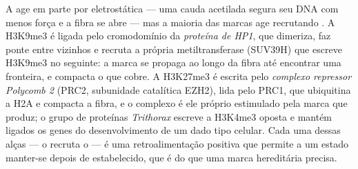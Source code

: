 \begin{proposition}\label{prop:b3:chromatin-epigenetics:readers}
A  age em parte por eletrostática --- uma cauda acetilada
segura seu DNA com menos força e a fibra se abre --- mas a maioria das
marcas age recrutando . A H3K9me3 é ligada pelo cromodomínio
da \emph{proteína de  HP1}, que dimeriza, faz ponte
entre  vizinhos e recruta a própria metiltransferase
(SUV39H) que escreve H3K9me3 no  seguinte: a marca se
propaga ao longo da fibra até encontrar uma fronteira, e compacta o
que cobre. A H3K27me3 é escrita pelo \emph{complexo repressor Polycomb
2} (PRC2, subunidade catalítica EZH2), lida pelo PRC1, que
ubiquitina a H2A e compacta a fibra, e o complexo é ele próprio
estimulado pela marca que produz; o grupo de proteínas
\emph{Trithorax} escreve a H3K4me3 oposta e mantém ligados os genes do
desenvolvimento de um dado tipo celular. Cada uma dessas alças --- o
 recruta o  --- é uma retroalimentação positiva que
permite a um estado manter-se depois de estabelecido, que é do que uma
marca hereditária precisa.
\end{proposition}

